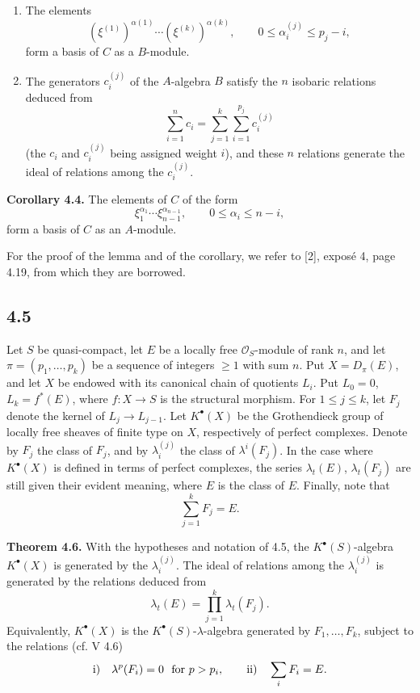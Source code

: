 \documentclass[11pt]{article}
\begin{document}
\begin{enumerate}[label=\roman*)]
\item The elements
\[
  (\xi^{(1)})^{\alpha(1)}\cdots(\xi^{(k)})^{\alpha(k)},
  \qquad
  0\leq \alpha_i^{(j)}\leq p_j-i,
\]
form a basis of \(C\) as a \(B\)-module.

\item The generators \(c_i^{(j)}\) of the \(A\)-algebra \(B\) satisfy the \(n\) isobaric relations deduced from
\[
  \sum_{i=1}^{n}c_i
  =
  \sum_{j=1}^{k}\sum_{i=1}^{p_j}c_i^{(j)}
\]
(the \(c_i\) and \(c_i^{(j)}\) being assigned weight \(i\)), and these \(n\) relations generate the ideal of relations among the \(c_i^{(j)}\).
\end{enumerate}

\textbf{Corollary 4.4.} The elements of \(C\) of the form
\[
  \xi_1^{\alpha_1}\cdots \xi_{n-1}^{\alpha_{n-1}},
  \qquad 0\leq \alpha_i\leq n-i,
\]
form a basis of \(C\) as an \(A\)-module.

For the proof of the lemma and of the corollary, we refer to [2], exposé 4, page 4.19, from which they are borrowed.

\subsection*{4.5}
Let \(S\) be quasi-compact, let \(E\) be a locally free \(\mathcal O_S\)-module of rank \(n\), and let \(\pi=(p_1,\ldots,p_k)\) be a sequence of integers \(\geq1\) with sum \(n\). Put \(X=D_\pi(E)\), and let \(X\) be endowed with its canonical chain of quotients \(L_i\). Put \(L_0=0\), \(L_k=f^*(E)\), where \(f:X\to S\) is the structural morphism. For \(1\leq j\leq k\), let \(F_j\) denote the kernel of \(L_j\to L_{j-1}\). Let \(K^\bullet(X)\) be the Grothendieck group of locally free sheaves of finite type on \(X\), respectively of perfect complexes. Denote by \(F_j\) the class of \(F_j\), and by \(\lambda_i^{(j)}\) the class of \(\lambda^i(F_j)\). In the case where \(K^\bullet(X)\) is defined in terms of perfect complexes, the series \(\lambda_t(E)\), \(\lambda_t(F_j)\) are still given their evident meaning, where \(E\) is the class of \(E\). Finally, note that
\[
  \sum_{j=1}^{k}F_j=E.
\]

\textbf{Theorem 4.6.} With the hypotheses and notation of 4.5, the \(K^\bullet(S)\)-algebra \(K^\bullet(X)\) is generated by the \(\lambda_i^{(j)}\). The ideal of relations among the \(\lambda_i^{(j)}\) is generated by the relations deduced from
\[
  \lambda_t(E)=\prod_{j=1}^{k}\lambda_t(F_j).
\]
Equivalently, \(K^\bullet(X)\) is the \(K^\bullet(S)\)-\(\lambda\)-algebra generated by \(F_1,\ldots,F_k\), subject to the relations (cf. V 4.6)
\[
  \text{\rm i)}\quad \lambda^p(F_i)=0\ \text{ for }p>p_i,
  \qquad
  \text{\rm ii)}\quad \sum_i F_i=E.
\]
\end{document}
